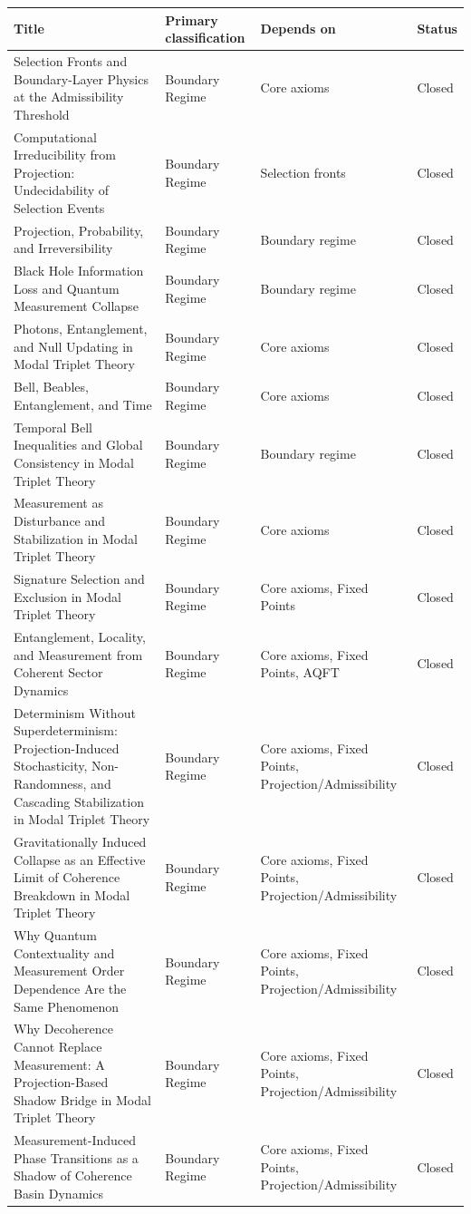 \documentclass[11pt]{article}
\begin{document}
\begin{center}
\small
\begin{tabular}{|p{7.2cm}|p{3.6cm}|p{3.6cm}|p{1.6cm}|}
\hline
\textbf{Title} & \textbf{Primary classification} & \textbf{Depends on} & \textbf{Status}\\
\hline
Selection Fronts and Boundary-Layer Physics at the Admissibility Threshold
& Boundary Regime & Core axioms & Closed\\
\hline
Computational Irreducibility from Projection: Undecidability of Selection Events
& Boundary Regime & Selection fronts & Closed\\
\hline
Projection, Probability, and Irreversibility
& Boundary Regime & Boundary regime & Closed\\
\hline
Black Hole Information Loss and Quantum Measurement Collapse
& Boundary Regime & Boundary regime & Closed\\
\hline
Photons, Entanglement, and Null Updating in Modal Triplet Theory &
Boundary Regime & Core axioms & Closed \\
\hline
Bell, Beables, Entanglement, and Time
& Boundary Regime
& Core axioms
& Closed
\\
\hline
Temporal Bell Inequalities and Global Consistency in Modal Triplet Theory
& Boundary Regime
& Boundary regime
& Closed
\\
\hline
Measurement as Disturbance and Stabilization in Modal Triplet Theory
& Boundary Regime
& Core axioms
& Closed
\\
\hline
Signature Selection and Exclusion in Modal Triplet Theory
& Boundary Regime
& Core axioms, Fixed Points
& Closed
\\
\hline
Entanglement, Locality, and Measurement from Coherent Sector Dynamics
& Boundary Regime
& Core axioms, Fixed Points, AQFT
& Closed\\
\hline
Determinism Without Superdeterminism: Projection-Induced Stochasticity, Non-Randomness, and Cascading Stabilization in Modal Triplet Theory
& Boundary Regime
& Core axioms, Fixed Points, Projection/Admissibility
& Closed\\
\hline
Gravitationally Induced Collapse as an Effective Limit of Coherence Breakdown in Modal Triplet Theory
& Boundary Regime
& Core axioms, Fixed Points, Projection/Admissibility
& Closed\\
\hline
Why Quantum Contextuality and Measurement Order Dependence Are the Same Phenomenon
& Boundary Regime
& Core axioms, Fixed Points, Projection/Admissibility
& Closed\\
\hline
Why Decoherence Cannot Replace Measurement: A Projection-Based Shadow Bridge in Modal Triplet Theory
& Boundary Regime
& Core axioms, Fixed Points, Projection/Admissibility
& Closed\\
\hline
Measurement-Induced Phase Transitions as a Shadow of Coherence Basin Dynamics
& Boundary Regime
& Core axioms, Fixed Points, Projection/Admissibility
& Closed\\
\hline

\end{tabular}
\end{center}
\end{document}
